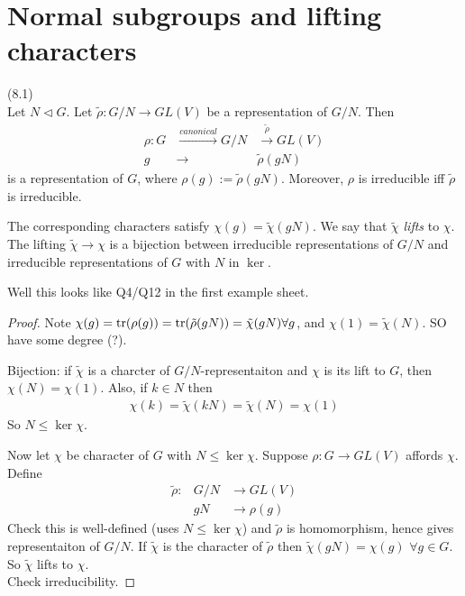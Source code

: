 \documentclass[a4paper]{article}
\begin{document}
\section{Normal subgroups and lifting characters}
\begin{lemma} (8.1)\\
Let $N \triangleleft G$. Let $\tilde{\rho} : G/N \to GL(V)$ be a representation of $G/N$. Then
\begin{equation*}
\begin{aligned}
\rho:G &\xrightarrow{canonical} G/N &\xrightarrow{\tilde{\rho}} GL(V)\\
g & \to & \tilde{\rho}(gN)
\end{aligned}
\end{equation*}
is a representation of $G$, where $\rho(g) := \tilde{\rho}(gN)$. Moreover, $\rho$ is irreducible iff $\tilde{\rho}$ is irreducible.

The corresponding characters satisfy $\chi(g) =\tilde{\chi} (gN)$. We say that $\tilde{\chi}$ \emph{lifts} to $\chi$. The lifting $\tilde{\chi} \to \chi$ is a bijection between irreducible representations of $G/N$ and irreducible representations of $G$ with $N$ in $\ker$.

Well this looks like Q4/Q12 in the first example sheet.

\begin{proof}
Note $\chi(g) = \operatorname{tr}(\rho(g)) = \operatorname{tr}(\tilde{\rho}(gN)) = \tilde{\chi}(gN) \forall g$, and $\chi(1) = \tilde{\chi}(N)$. SO have some degree (?).

Bijection: if $\tilde{\chi}$ is a charcter of $G/N$-representaiton and $\chi$ is its lift to $G$, then $\chi(N) = \chi(1)$. Also, if $k \in N$ then 
\begin{equation*}
\begin{aligned}
\chi(k) = \tilde{\chi} (kN) = \tilde{\chi}(N) = \chi(1)
\end{aligned}
\end{equation*}
So $N \leq \ker\chi$.

Now let $\chi$ be character of $G$ with $N \leq \ker\chi$. Suppose $\rho:G \to GL(V)$ affords $\chi$. Define
\begin{equation*}
\begin{aligned}
\tilde{\rho}: & G/N &\to GL(V)\\
&gN &\to \rho(g)
\end{aligned}
\end{equation*}
Check this is well-defined (uses $N \leq \ker\chi$) and $\tilde{\rho}$ is homomorphism, hence gives representaiton of $G/N$. If $\tilde{\chi}$ is the character of $\tilde{\rho}$ then $\tilde{\chi}(gN) = \chi(g)$ $\forall g\in G$. So $\tilde{\chi}$ lifts to $\chi$.\\
Check irreducibility.
\end{proof}
\end{lemma}
\end{document}
